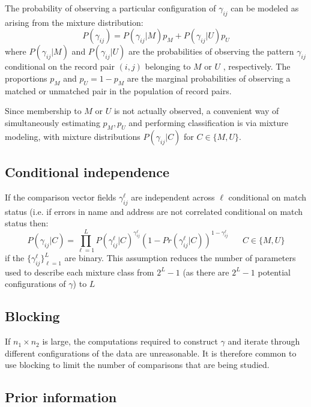 \documentclass[11pt,reqno]{amsart}
\begin{document}
The probability of observing a particular configuration of $\gamma_{ij}$ can be modeled as arising from the mixture distribution:
\begin{equation}
P(\gamma_{ij}) = P(\gamma_{ij} | M) p_M + P(\gamma_{ij} | U) p_U 
\label{mm}
\end{equation}
where $P(\gamma_{ij} | M)$ and $P(\gamma_{ij} | U)$ are the probabilities of observing the pattern $\gamma_{ij}$ conditional on the record pair $(i,j)$ belonging to $M$ or $U$ , respectively.  The proportions $p_M$ and $p_U = 1-p_M$ are the marginal probabilities of observing a matched or unmatched pair in the population of record pairs. 

Since membership to $M$ or $U$ is not actually observed, a convenient way of simultaneously estimating $p_M, p_U$ and performing classification is via mixture modeling, with mixture distributions $P(\gamma_{ij} | C)$ for $C\in\{M,U\}$.  

\subsection{Conditional independence} If the comparison vector fields $\gamma_{ij}^{\ell}$ are independent across $\ell$ conditional on match status (i.e. if errors in name and address are not correlated conditional on match status %
then: 
 \begin{equation} 
 P(\gamma_{ij} | C) = \prod_{\ell=1}^L P(\gamma_{ij}^{\ell} | C)^{\gamma_{ij}^{\ell}}(1-Pr(\gamma_{ij}^{\ell} | C))^{1-\gamma_{ij}^{\ell}} \hspace{20pt} C\in \{M, U\} 
 \label{eq:condInd}
 \end{equation}
 if the $\{\gamma_{ij}^{\ell}\}_{\ell=1}^L$ are binary.  This assumption reduces the number of parameters used to describe each mixture class from $2^L -1$ (as there are $2^L-1$ potential configurations of $\gamma$) to $L$
 
 
 \subsection{Blocking}  If $n_1\times n_2$ is large, the computations required to construct $\gamma$ and iterate through different configurations of the data are unreasonable.  It is therefore common to use blocking to limit the number of comparisons that are being studied.  
 
 \subsection{Prior information}
 
\end{document}
